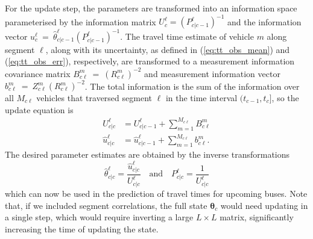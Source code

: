 For the update step, the parameters are transformed into an information
space parameterised by the information matrix $U^\ell_c = (P_{c|c-1}^\ell)^{-1}$
and the information vector $u^\ell_c~=~\hat \theta^\ell_{c|c-1} (P^\ell_{c|c-1})^{-1}$.
The travel time estimate of vehicle $m$ along segment $\ell$,
along with its uncertainty, 
as defined in (\ref{eq:tt_obs_mean}) and (\ref{eq:tt_obs_err}), respectively,
are transformed to a measurement information covariance matrix 
$B_{c\ell}^{m}~=~(R_{c\ell}^m)^{-2}$
and measurement information vector $b_{c\ell}^{m}~=~Z_{c\ell}^{m} (R_{c\ell}^{m})^{-2}$.
The total information is the sum of the information over all $M_{c\ell}$ vehicles
that traversed segment $\ell$ in the time interval $(t_{c-1}, t_c]$,
so the update equation is
\begin{align*}
U^\ell_{c|c} &= U^\ell_{c|c-1} + \sum_{m=1}^{M_{c\ell}} B_{c\ell}^{m} \\
\hat u^\ell_{c|c} &= \hat u^\ell_{c|c-1} + \sum_{m=1}^{M_{c\ell}} b_{c\ell}^{m}.
\end{align*}
The desired parameter estimates are obtained 
by the inverse transformations
\begin{equation*}
\hat \theta^\ell_{c|c} = \frac{\hat u^\ell_{c|c}}{U^\ell_{c|c}} 
\quad\text{and}\quad
P^\ell_{c|c} = \frac{1}{U^\ell_{c|c}}
\end{equation*}
which can now be used in the prediction of travel times
for upcoming buses. 
Note that, if we included segment correlations,
the full state $\boldsymbol{\theta}_c$ would need updating in a single step,
which would require inverting a large $L\times L$ matrix,
significantly increasing the time of updating the state.



